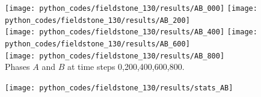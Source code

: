 \begin{center}
\texttt{[image: python\_codes/fieldstone\_130/results/AB\_000]}
\texttt{[image: python\_codes/fieldstone\_130/results/AB\_200]}\\
\texttt{[image: python\_codes/fieldstone\_130/results/AB\_400]}
\texttt{[image: python\_codes/fieldstone\_130/results/AB\_600]}\\
\texttt{[image: python\_codes/fieldstone\_130/results/AB\_800]}\\
{\captionfont Phases $A$ and $B$ at time steps 0,200,400,600,800.}
\end{center}


\begin{center}
\texttt{[image: python\_codes/fieldstone\_130/results/stats\_AB]}
\end{center}
